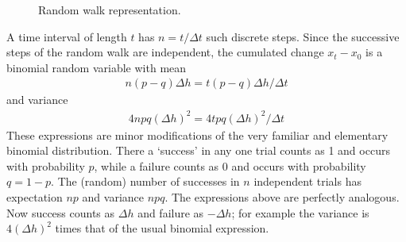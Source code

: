 \documentclass[\topdir/lecture\_notes.tex]{subfiles}
\begin{document}
\begin{figure}
    \caption{Random walk representation.}\label{fig:random_walk}
\end{figure}

A time interval of length $t$ has $n=t / \Delta t$ such discrete steps. Since the successive steps of the random walk are independent, the cumulated change $x_{t}-x_{0}$ is a binomial random variable with mean
\begin{align*}
n(p-q) \Delta h=t(p-q) \Delta h / \Delta t
\end{align*}
and variance
\begin{align*}
4 n p q(\Delta h)^{2}=4 t p q(\Delta h)^{2} / \Delta t
\end{align*}
These expressions are minor modifications of the very familiar and elementary binomial distribution. There a `success' in any one trial counts as 1 and occurs with probability $p$, while a failure counts as 0 and occurs with probability $q=1-p$. The (random) number of successes in $n$ independent trials has expectation $n p$ and variance $n p q$. The expressions above are perfectly analogous. Now success counts as $\Delta h$ and failure as $-\Delta h$; for example the variance is $4(\Delta h)^{2}$ times that of the usual binomial expression.
\end{document}

